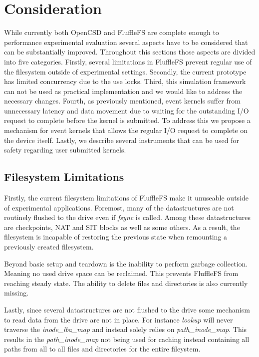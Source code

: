 \chapter{Consideration}

While currently both OpenCSD and FluffleFS are complete enough to performance
experimental evaluation several aspects have to be considered that can be
substantially improved. Throughout this sections those aspects are divided into
five categories. Firstly, several limitations in FluffleFS prevent regular use
of the filesystem outside of experimental settings. Secondly, the current
prototype has limited concurrency due to the use locks. Third, this simulation
framework can not be used as practical implementation and we would like to
address the necessary changes. Fourth, as previously mentioned, event kernels
suffer from unnecessary latency and data movement due to waiting for the
outstanding I/O request to complete before the kernel is submitted. To address
this we propose a mechanism for event kernels that allows the regular I/O
request to complete on the device itself. Lastly, we describe several
instruments that can be used for safety regarding user submitted kernels.

\section{Filesystem Limitations}

Firstly, the current filesystem limitations of FluffleFS make it unuseable
outside of experimental applications. Foremost, many of the datastructures are
not routinely flushed to the drive even if \textit{fsync} is called. Among
these datastructures are checkpoints, NAT and SIT blocks as well as some others.
As a result, the filesystem is incapable of restoring the previous state when
remounting a previously created filesystem.

Beyond basic setup and teardown is the inability to perform garbage collection.
Meaning no used drive space can be reclaimed. This prevents FluffleFS from
reaching steady state. The ability to delete files and directories is also
currently missing.

Lastly, since several datastructures are not flushed to the drive some mechanism
to read data from the drive are not in place. For instance \textit{lookup} will
never traverse the \textit{inode\_lba\_map} and instead solely relies on
\textit{path\_inode\_map}. This results in the \textit{path\_inode\_map} not
being used for caching instead containing all paths from all to all files and
directories for the entire fileystem.

